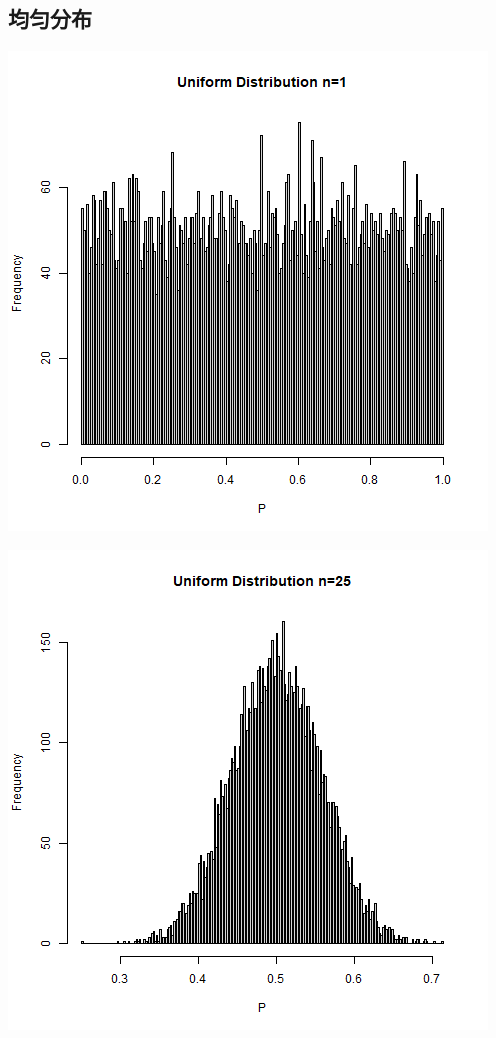 \documentclass{article}
\begin{document}
\begin{CJK}{UTF8}{gbsn}
\subsection{均匀分布}
\begin{minipage}{0.5\textwidth}
    \includegraphics[scale=0.6]{hist2-1.png}
\end{minipage}
\begin{minipage}{0.5\textwidth}
    \includegraphics[scale=0.6]{hist2-2.png}

\end{minipage}
\end{CJK}
\end{document}
